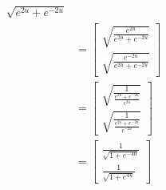 \documentclass[a4paper, 11pt]{article}
\begin{document}
\begin{enumerate}[label=(\alph*)]
\begin{minipage}[t]{0.5\textwidth}
\begin{align*}
{            \sqrt{e^{2u}+e^{-2u}}
            }                                           \\
                & =    \begin{bmatrix}
                         \sqrt{\frac{e^{2u}}{e^{2u} + e^{-2u}}} \\
                         \sqrt{\frac{e^{-2u}}{e^{2u} + e^{-2u}}}
                       \end{bmatrix}    \\
                & =    \begin{bmatrix}
                         \sqrt{\frac{1}{\frac{e^{2u} + e^{-2u}}{e^{2u}}}} \\
                         \sqrt{\frac{1}{\frac{e^{2u} + e^{-2u}}{e^{-2u}}}}
                       \end{bmatrix}    \\
                & =    \begin{bmatrix}
                         \frac{1}{\sqrt{1 + e^{-4u}}} \\
                         \frac{1}{\sqrt{1 + e^{4u}}}
                       \end{bmatrix}
          \end{align*}
        \end{minipage}


\end{enumerate}
\end{document}
